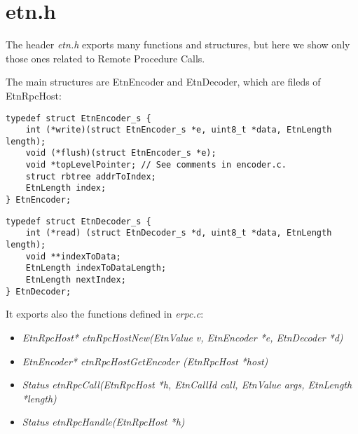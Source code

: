 \section{etn.h}

The header \emph{etn.h} exports many functions and structures, but here we show only those ones related to Remote Procedure Calls.

The main structures are EtnEncoder and EtnDecoder, which are fileds of EtnRpcHost:

\begin{lstlisting}
typedef struct EtnEncoder_s {
	int (*write)(struct EtnEncoder_s *e, uint8_t *data, EtnLength length);
	void (*flush)(struct EtnEncoder_s *e);
	void *topLevelPointer; // See comments in encoder.c.
	struct rbtree addrToIndex;
	EtnLength index;
} EtnEncoder;
\end{lstlisting}

\begin{lstlisting}
typedef struct EtnDecoder_s {
	int (*read) (struct EtnDecoder_s *d, uint8_t *data, EtnLength length);
	void **indexToData;
	EtnLength indexToDataLength;
	EtnLength nextIndex;
} EtnDecoder;
\end{lstlisting}

It exports also the functions defined in \emph{erpc.c}:

\begin{itemize}

	\item \emph{EtnRpcHost* etnRpcHostNew(EtnValue v, EtnEncoder *e, EtnDecoder *d)}

	\item \emph{EtnEncoder* etnRpcHostGetEncoder (EtnRpcHost *host)}

	\item \emph{Status etnRpcCall(EtnRpcHost *h, EtnCallId call, EtnValue args, EtnLength *length)}

	\item \emph{Status etnRpcHandle(EtnRpcHost *h)}

\end{itemize}
